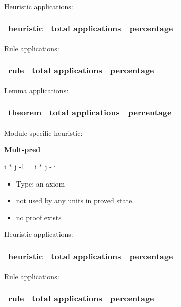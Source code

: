 \documentclass[a4paper]{article}
\begin{document}
\medskip


Heuristic applications:

\begin{supertabular}{l|r|r}
heuristic	& total applications & percentage \\ \hline

\end{supertabular}

Rule applications:

\begin{supertabular}{l|r|r}
rule	        & total applications & percentage \\ \hline

\end{supertabular}

Lemma applications:

\begin{supertabular}{l|r|r}
theorem	        & total applications & percentage \\ \hline

\end{supertabular}

Module specific heuristic:

\pagebreak

{\LARGE\bf Mult-pred}\label{lemma-Mult-pred}

\medskip

 \Fol i $*$ j -1 = i $*$ j - i

\begin{itemize}

\item Type: an axiom

\item not used by any units in proved state.
\item       no proof exists
\end{itemize}

\medskip


Heuristic applications:

\begin{supertabular}{l|r|r}
heuristic	& total applications & percentage \\ \hline

\end{supertabular}

Rule applications:

\begin{supertabular}{l|r|r}
rule	        & total applications & percentage \\ \hline

\end{supertabular}
\end{document}

